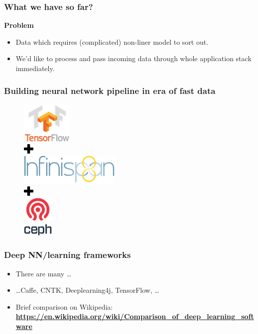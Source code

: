 \documentclass[10pt,utf8]{beamer}
\begin{document}
\begin{frame}
	\frametitle{What we have so far?}
	 {
		\centering
		\textbf{\Large{Problem}}
	}
	\vspace{0.5cm}
	\visible<3> {
		\begin{itemize}
			\item Data which requires (complicated) non-liner model to sort out.
			\item We'd like to process and pass incoming data through whole application stack immediately.
		\end{itemize}
	}
\end{frame}


\begin{frame}
	\frametitle{Building neural network pipeline in era of fast data}
	\begin{figure}
		\centering
		 {
			\includegraphics[height=2cm]{./img/tensorflow_logo.eps}\\
		}
		\visible<3,4> {
			\includegraphics[height=0.5cm]{./img/plus.eps}\\
			\includegraphics[height=1.5cm]{./img/infinispan8_logo.eps}\\
		}
		\visible<4> {
			\includegraphics[height=0.5cm]{./img/plus.eps}\\
			\includegraphics[height=2cm]{./img/ceph_logo.eps}
		}
	\end{figure}
\end{frame}

\begin{frame}
	\frametitle{Deep NN/learning frameworks}
	\begin{itemize}
		\item There are many \dots \pause
		\item \dots Caffe, CNTK, Deeplearning4j, TensorFlow, \dots \pause
		\item Brief comparison on Wikipedia: \\ \textbf{\footnotesize{\color{blue} \url{https://en.wikipedia.org/wiki/Comparison_of_deep_learning_software}}}
	\end{itemize}
\end{frame}
\end{document}
